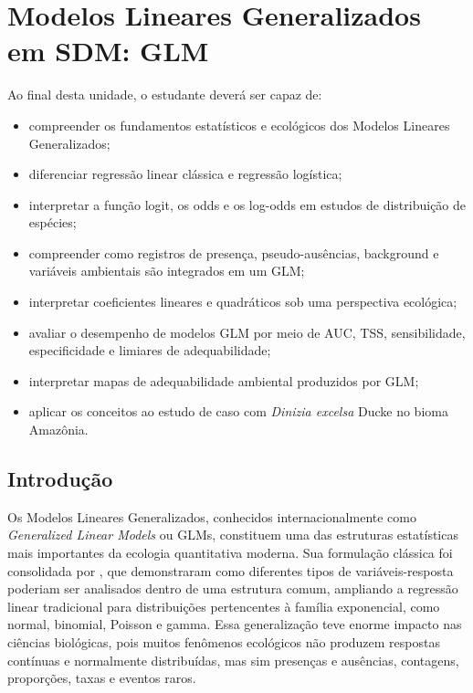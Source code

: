 
\chapter{Modelos Lineares Generalizados em SDM: GLM}

\begin{objetivos}
	Ao final desta unidade, o estudante deverá ser capaz de:
	
	\begin{itemize}
		\item compreender os fundamentos estatísticos e ecológicos dos Modelos Lineares Generalizados;
		\item diferenciar regressão linear clássica e regressão logística;
		\item interpretar a função logit, os odds e os log-odds em estudos de distribuição de espécies;
		\item compreender como registros de presença, pseudo-ausências, background e variáveis ambientais são integrados em um GLM;
		\item interpretar coeficientes lineares e quadráticos sob uma perspectiva ecológica;
		\item avaliar o desempenho de modelos GLM por meio de AUC, TSS, sensibilidade, especificidade e limiares de adequabilidade;
		\item interpretar mapas de adequabilidade ambiental produzidos por GLM;
		\item aplicar os conceitos ao estudo de caso com \textit{Dinizia excelsa} Ducke no bioma Amazônia.
	\end{itemize}
\end{objetivos}

\section{Introdução}

Os Modelos Lineares Generalizados, conhecidos internacionalmente como \textit{Generalized Linear Models} ou GLMs, constituem uma das estruturas estatísticas mais importantes da ecologia quantitativa moderna. Sua formulação clássica foi consolidada por \citet{mccullagh1989generalized}, que demonstraram como diferentes tipos de variáveis-resposta poderiam ser analisados dentro de uma estrutura comum, ampliando a regressão linear tradicional para distribuições pertencentes à família exponencial, como normal, binomial, Poisson e gamma. Essa generalização teve enorme impacto nas ciências biológicas, pois muitos fenômenos ecológicos não produzem respostas contínuas e normalmente distribuídas, mas sim presenças e ausências, contagens, proporções, taxas e eventos raros.


